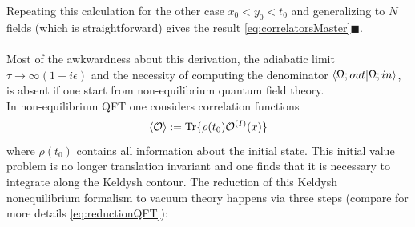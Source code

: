 Repeating this calculation for the other case $x_0<y_0<t_0$ and generalizing to $N$ fields (which is straightforward) gives the result \ref{eq:correlatorsMaster}$\blacksquare$.\\
\\
Most of the awkwardness about this derivation, the adiabatic limit $\tau\rightarrow \infty (1-i\epsilon)$ and the necessity of computing the denominator $\braket{\Omega;out}{\Omega;in}$, is absent if one start from non-equilibrium quantum field theory.\\
In non-equilibrium QFT one considers correlation functions
\begin{equation}
	\expval{\mathcal{O}} := \mathrm{Tr} \{\rho(t_0) \mathcal{O}^{(I)}(x)\}
\end{equation}
where $\rho(t_0)$ contains all information about the initial state. This initial value problem is no longer translation invariant and one finds that it is necessary to integrate along the Keldysh contour. The reduction of this Keldysh nonequilibrium formalism to vacuum theory happens via three steps (compare for more details \ref{eq:reductionQFT}):
